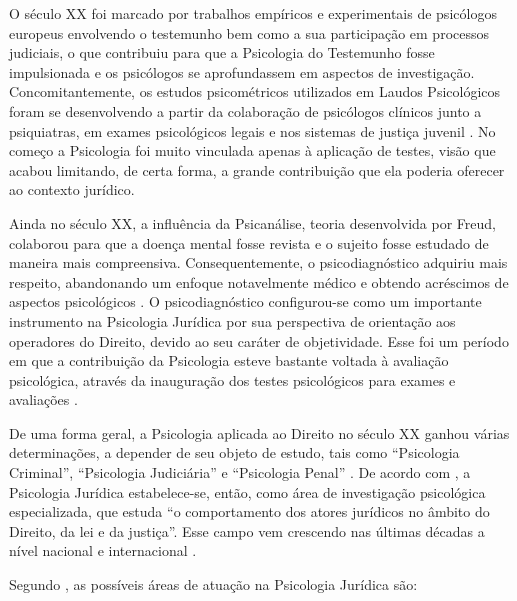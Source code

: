 O século XX foi marcado por trabalhos empíricos e experimentais de psicólogos europeus envolvendo o testemunho bem como a sua participação em processos judiciais, o que contribuiu para que a Psicologia do Testemunho fosse impulsionada e os psicólogos se aprofundassem em aspectos de investigação. Concomitantemente, os estudos psicométricos utilizados em Laudos Psicológicos foram se desenvolvendo a partir da colaboração de psicólogos clínicos junto a psiquiatras, em exames psicológicos legais e nos sistemas de justiça juvenil \cite{JESUS2001}. No começo a Psicologia foi muito vinculada apenas à aplicação de testes, visão que acabou limitando, de certa forma, a grande contribuição que ela poderia oferecer ao contexto jurídico.

Ainda no século XX, a influência da Psicanálise, teoria desenvolvida por Freud, colaborou para que a doença mental fosse revista e o sujeito fosse estudado de maneira mais compreensiva. Consequentemente, o psicodiagnóstico adquiriu mais respeito, abandonando um enfoque notavelmente médico e obtendo acréscimos de aspectos psicológicos . O psicodiagnóstico configurou-se como um importante instrumento na Psicologia Jurídica por sua perspectiva de orientação aos operadores do Direito, devido ao seu caráter de objetividade. Esse foi um período em que a contribuição da Psicologia esteve bastante voltada à avaliação psicológica, através da inauguração dos testes psicológicos para exames e avaliações \cite{LAGO2009}.

De uma forma geral, a Psicologia aplicada ao Direito no século XX ganhou várias determinações, a depender de seu objeto de estudo, tais como ``Psicologia Criminal'', ``Psicologia Judiciária'' e ``Psicologia Penal'' \cite[p. 234]{COSTA2009}. De acordo com , a Psicologia Jurídica estabelece-se, então, como área de investigação psicológica especializada, que estuda ``o comportamento dos atores jurídicos no âmbito do Direito, da lei e da justiça''. Esse campo vem crescendo nas últimas décadas a nível nacional e internacional \cite{LEAL2008}.

Segundo , as possíveis áreas de atuação na Psicologia Jurídica são:

